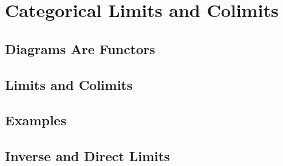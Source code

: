 \chapter{Categorical Limits and Colimits}

\section{Diagrams Are Functors}



\section{Limits and Colimits}



\section{Examples}




\section{Inverse and Direct Limits}

